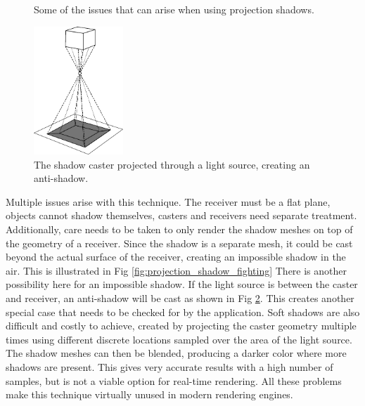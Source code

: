 \begin{figure}[h]
    \caption{Some of the issues that can arise when using projection shadows.}
    \label{fig:projection_shadow_issues}
\end{figure}

\begin{figure}[h]
	\centering
	\includegraphics[width=0.3\textwidth]{./graf/projection_anti_shadow.pdf}
	\caption{The shadow caster projected through a light source, creating an anti-shadow.}
	\label{fig:projection_anti_shadow}
\end{figure}

Multiple issues arise with this technique. The receiver must be a flat plane, objects cannot shadow themselves, casters and receivers need separate treatment. Additionally, care needs to be taken to only render the shadow meshes on top of the geometry of a receiver. Since the shadow is a separate mesh, it could be cast beyond the actual surface of the receiver, creating an impossible shadow in the air. This is illustrated in Fig \ref{fig:projection_shadow_fighting} There is another possibility here for an impossible shadow. If the light source is between the caster and receiver, an anti-shadow will be cast as shown in Fig \ref{fig:projection_anti_shadow}. This creates another special case that needs to be checked for by the application. Soft shadows are also difficult and costly to achieve, created by projecting the caster geometry multiple times using different discrete locations sampled over the area of the light source. The shadow meshes can then be blended, producing a darker color where more shadows are present. This gives very accurate results with a high number of samples, but is not a viable option for real-time rendering. All these problems make this technique virtually unused in modern rendering engines.


